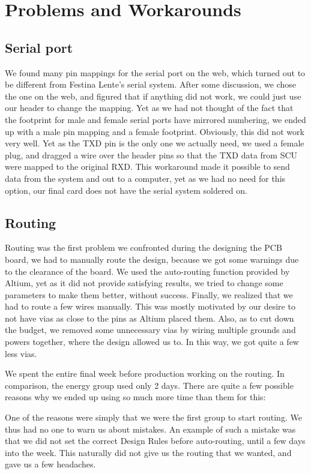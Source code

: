 \section {Problems and Workarounds}
\subsection{Serial port}
We found many pin mappings for the serial port on the web, which turned out to
be different from Festina Lente's serial system. After some discussion, we chose
the one on the web, and figured that if anything did not work, we could just
use our header to change the mapping.  Yet as we had not thought of the fact
that the footprint for male and female serial ports have mirrored numbering,
we ended up with a male pin mapping and a female footprint.  Obviously,
this did not work very well. Yet as the TXD pin is the only one we actually
need, we used a female plug, and dragged a wire over the header pins so that
the TXD data from SCU were mapped to the original RXD. This workaround made it
possible to send data from the system and out to a computer, yet as we had no
need for this option, our final card does not have the serial system soldered on.

\subsection{Routing}
 Routing was the first problem we confronted during the designing the \ac{PCB}
board, we had to manually route the design, because we got some warnings due to
the clearance of the board. We used the auto-routing function provided by
Altium, yet as it did not provide satisfying results, we tried to change some
parameters to make them better, without success. Finally, we realized that we
had to route a few wires manually. This was mostly motivated by our desire to
not have vias as close to the pins as Altium placed them. Also, as to cut down
the budget, we removed some unnecessary vias by wiring multiple grounds and
powers together, where the design allowed us to. In this way, we got quite a few
less vias.

We spent the entire final week before production working on the routing. In comparison, the energy group used only 2 days. There are quite a few possible reasons why we ended up using so much more time than them for this:

One of the reasons were simply that we were the first group to start routing. We thus had no one to warn us about mistakes. An example of such a mistake was that we did not set the correct Design Rules before auto-routing, until a few days into the week. This naturally did not give us the routing that we wanted, and gave us a few headaches.

